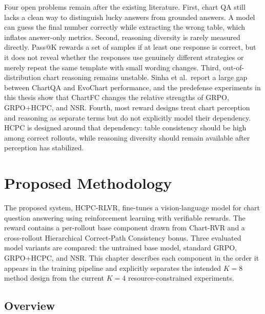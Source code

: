 \documentclass{iutbscthesis}
\begin{document}
Four open problems remain after the existing literature. First, chart QA still lacks a clean way to distinguish lucky answers from grounded answers. A model can guess the final number correctly while extracting the wrong table, which inflates answer-only metrics. Second, reasoning diversity is rarely measured directly. Pass@K rewards a set of samples if at least one response is correct, but it does not reveal whether the responses use genuinely different strategies or merely repeat the same template with small wording changes. Third, out-of-distribution chart reasoning remains unstable. Sinha et al.\ report a large gap between ChartQA and EvoChart performance, and the predefense experiments in this thesis show that ChartFC changes the relative strengths of GRPO, GRPO+HCPC, and NSR. Fourth, most reward designs treat chart perception and reasoning as separate terms but do not explicitly model their dependency. HCPC is designed around that dependency: table consistency should be high among correct rollouts, while reasoning diversity should remain available after perception has stabilized.


\chapter{Proposed Methodology} \label{chapter:proposed}

The proposed system, HCPC-RLVR, fine-tunes a vision-language model for chart question answering using reinforcement learning with verifiable rewards. The reward contains a per-rollout base component drawn from Chart-RVR and a cross-rollout Hierarchical Correct-Path Consistency bonus. Three evaluated model variants are compared: the untrained base model, standard GRPO, GRPO+HCPC, and NSR. This chapter describes each component in the order it appears in the training pipeline and explicitly separates the intended $K=8$ method design from the current $K=4$ resource-constrained experiments.

\section{Overview}
\end{document}
